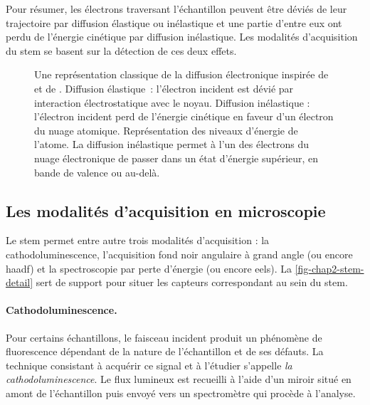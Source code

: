     Pour résumer, les électrons traversant l'échantillon peuvent être déviés de leur trajectoire par diffusion élastique ou inélastique et une partie d'entre eux ont perdu de l'énergie cinétique par diffusion inélastique. Les modalités d'acquisition du \gls{stem} se basent sur la détection de ces deux effets.

    \begin{figure}
    	\centering
    	
        \vspace{1em}
    	\caption{Une représentation classique de la diffusion électronique inspirée de~\cite{egerton2011electron} et de \cite{colliex1998microscopie}.
         Diffusion élastique : l'électron incident est dévié par interaction électrostatique avec le noyau. 
         Diffusion inélastique : l'électron incident perd de l'énergie cinétique en faveur d'un électron du nuage atomique.
         Représentation des niveaux d'énergie de l'atome. La diffusion inélastique permet à l'un des électrons du nuage électronique de passer dans un état d'énergie supérieur, en bande de valence ou au-delà.  %
            \protect\label{fig-chap2-interactions}}
    \end{figure}


    \subsection{Les modalités d'acquisition en microscopie }\label{subsec-modalitees-stem}

    Le \gls{stem} permet entre autre trois modalités d'acquisition : la cathodoluminescence, l'acquisition fond noir angulaire à grand angle (ou encore \gls{haadf}) et la spectroscopie par perte d'énergie (ou encore \gls{eels}). La \cref{fig-chap2-stem-detail} sert de support pour situer les capteurs correspondant au sein du \gls{stem}.

    \paragraph*{Cathodoluminescence.} Pour certains échantillons, le faisceau incident produit un phénomène de fluorescence dépendant de la nature de l'échantillon et de ses défauts. La technique consistant à acquérir ce signal et à l'étudier s'appelle \emph{la cathodoluminescence}. Le flux lumineux est recueilli à l'aide d'un miroir situé en amont de l'échantillon puis envoyé vers un spectromètre qui procède à l'analyse.

